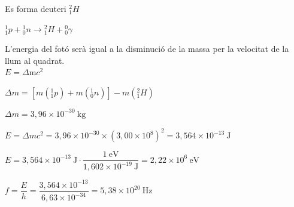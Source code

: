 \begin{solapartat}
 Es forma deuteri ${}^{2}_{1}H$

 ${}^{1}_{1}p + {}^{1}_{0}n \rightarrow {}^{2}_{1}H + {}^{0}_{0}\gamma$
\end{solapartat}

\begin{solapartat}
 L'energia del fotó serà igual a la disminució de la massa per la velocitat de la llum al quadrat.\\
$E = \Delta\mathrm{m}c^2$

 $\Delta m = [m({}^{1}_{1}p) + m({}^{1}_{0}n)] - m({}^{2}_{1}H)$

 $\Delta m = 3,96\times 10^{-30}\ \mathrm{kg}$

 $E = \Delta mc^2 = 3,96\times 10^{-30}\times (3,00\times 10^{8})^2 = 3,564\times 10^{-13}\ \mathrm{J}$

 $E = 3,564\times 10^{-13}\ \mathrm{J}\cdot\dfrac{1\ \mathrm{eV}}{1,602\times 10^{-19}\ \mathrm{J}} = 2,22\times 10^{6}\ \mathrm{eV}$

 $f = \dfrac{E}{h} = \dfrac{3,564\times 10^{-13}}{6,63\times 10^{-34}} = 5,38\times 10^{20}\ \mathrm{Hz}$
\end{solapartat}
